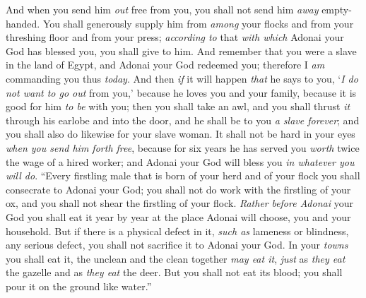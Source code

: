 \begin{biblechapter}
\verse And when you send him \textit{out} free from you, you shall not send him \textit{away} empty-handed.
\verse You shall generously supply him from \textit{among} your flocks and from your threshing floor and from your press; \textit{according to} that \textit{with which} Adonai your God has blessed you, you shall give to him.
\verse And remember that you were a slave in the land of Egypt, and Adonai your God redeemed you; therefore I \textit{am} commanding you thus \textit{today}.
\verse And then \textit{if} it will happen \textit{that} he says to you, ‘\textit{I do not want to go out} from you,’ because he loves you and your family, because it is good for him \textit{to be} with you;
\verse then you shall take an awl, and you shall thrust \textit{it} through his earlobe and into the door, and he shall be to you \textit{a slave forever}; and you shall also do likewise for your slave woman.
\verse It shall not be hard in your eyes \textit{when you send him forth free}, because for six years he has served you \textit{worth} twice the wage of a hired worker; and Adonai your God will bless you \textit{in whatever you will do}.
\verse “Every firstling male that is born of your herd and of your flock you shall consecrate to Adonai your God; you shall not do work with the firstling of your ox, and you shall not shear the firstling of your flock.
\verse \textit{Rather} \textit{before Adonai} your God you shall eat it year by year at the place Adonai will choose, you and your household.
\verse But if there is a physical defect in it, \textit{such as} lameness or blindness, any serious defect, you shall not sacrifice it to Adonai your God.
\verse In your \textit{towns} you shall eat it, the unclean and the clean together \textit{may eat it}, \textit{just} as \textit{they eat} the gazelle and as \textit{they eat} the deer.
\verse But you shall not eat its blood; you shall pour it on the ground like water.”
\end{biblechapter}

